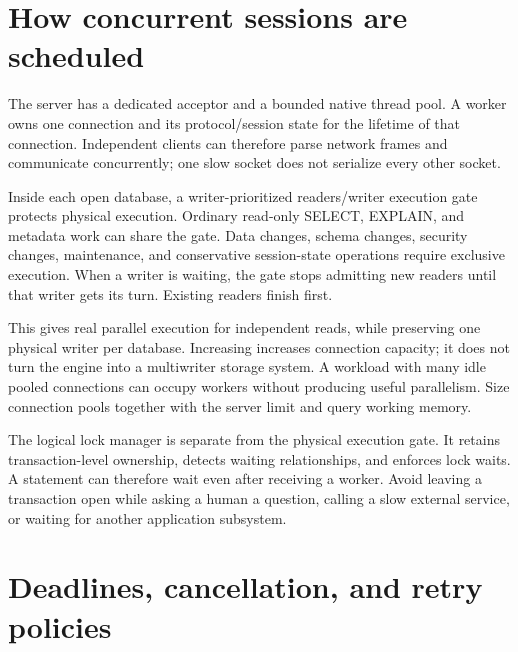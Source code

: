 
\section{How concurrent sessions are scheduled}

The server has a dedicated acceptor and a bounded native thread pool. A
worker owns one connection and its protocol/session state for the lifetime
of that connection. Independent clients can therefore parse network frames
and communicate concurrently; one slow socket does not serialize every
other socket.

Inside each open database, a writer-prioritized readers/writer execution
gate protects physical execution. Ordinary read-only SELECT, EXPLAIN, and
metadata work can share the gate. Data changes, schema changes, security
changes, maintenance, and conservative session-state
operations require exclusive execution. When a writer is waiting, the gate
stops admitting new readers until that writer gets its turn. Existing readers
finish first.

This gives real parallel execution for independent reads, while preserving
one physical writer per database. Increasing  increases
connection capacity; it does not turn the engine into a multiwriter storage
system. A workload with many idle pooled connections can occupy workers
without producing useful parallelism. Size connection pools together with
the server limit and query working memory.

The logical lock manager is separate from the physical execution gate. It
retains transaction-level ownership, detects waiting relationships, and
enforces lock waits. A statement can therefore wait even after receiving a
worker. Avoid leaving a transaction open while asking a human a question,
calling a slow external service, or waiting for another application subsystem.


\section{Deadlines, cancellation, and retry policies}

